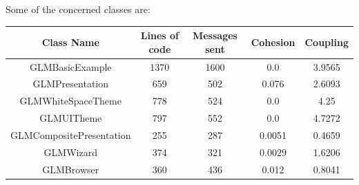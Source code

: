 \documentclass[11pt,a4paper]{article}
\begin{document}
Some of the concerned classes are:\\ 

\begin{tabular}{| c | c | c | c | c |}
\hline 
\textbf{Class Name} &\textbf{ Lines of code} & \textbf{Messages sent} & \textbf{Cohesion} & \textbf{Coupling}\\
\hline
GLMBasicExample & 1370 & 1600 & 0.0 & 3.9565\\
\hline
GLMPresentation & 659 & 502 & 0.076 & 2.6093\\
\hline
GLMWhiteSpaceTheme & 778 & 524 & 0.0 & 4.25 \\
\hline
GLMUITheme & 797 & 552 & 0.0 & 4.7272\\
\hline
GLMCompositePresentation & 255 & 287 & 0.0051 & 0.4659\\
\hline 
GLMWizard &  374 & 321 & 0.0029 & 1.6206\\
\hline
GLMBrowser & 360 & 436 & 0.012 & 0.8041\\
\hline
\end{tabular}
\end{document}
